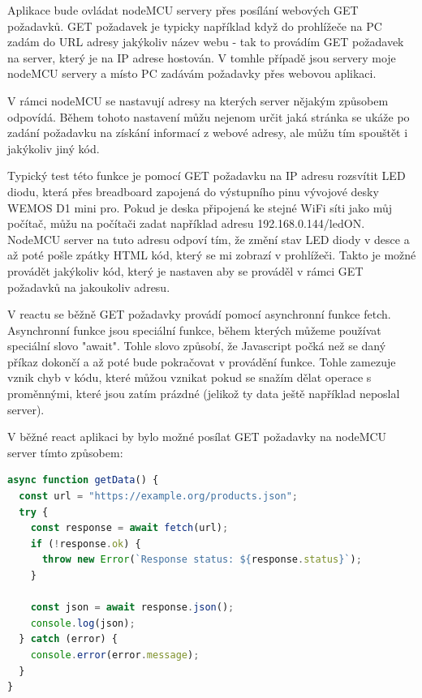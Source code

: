 Aplikace bude ovládat nodeMCU servery přes posílání webových GET požadavků. GET požadavek je typicky například když do prohlížeče na PC zadám do URL adresy jakýkoliv název webu - tak to provádím GET požadavek na server, který je na IP adrese hostován. V tomhle případě jsou servery moje nodeMCU servery a místo PC zadávám požadavky přes webovou aplikaci.

V rámci nodeMCU se nastavují adresy na kterých server nějakým způsobem odpovídá. Během tohoto nastavení můžu nejenom určit jaká stránka se ukáže po zadání požadavku na získání informací z webové adresy, ale můžu tím spouštět i jakýkoliv jiný kód. 

Typický test této funkce je pomocí GET požadavku na IP adresu rozsvítit LED diodu, která přes breadboard zapojená do výstupního pinu vývojové desky WEMOS D1 mini pro. Pokud je deska připojená ke stejné WiFi síti jako můj počítač, můžu na počítači zadat například adresu 192.168.0.144/ledON. NodeMCU server na tuto adresu odpoví tím, že změní stav LED diody v desce a až poté pošle zpátky HTML kód, který se mi zobrazí v prohlížeči. Takto je možné provádět jakýkoliv kód, který je nastaven aby se prováděl v rámci GET požadavků na jakoukoliv adresu.

V reactu se běžně GET požadavky provádí pomocí asynchronní funkce fetch. Asynchronní funkce jsou speciální funkce, během kterých můžeme používat speciální slovo "await". Tohle slovo způsobí, že Javascript počká než se daný příkaz dokončí a až poté bude pokračovat v provádění funkce. Tohle zamezuje vznik chyb v kódu, které můžou vznikat pokud se snažím dělat operace s proměnnými, které jsou zatím prázdné (jelikož ty data ještě například neposlal server).

V běžné react aplikaci by bylo možné posílat GET požadavky na nodeMCU server tímto způsobem:

\begin{lstlisting}[language=JavaScript, caption={Základní způsob posílání GET požadavků v JavaScriptu}, label={lst:JavaScriptFetchFunkce}]
async function getData() {
  const url = "https://example.org/products.json";
  try {
    const response = await fetch(url);
    if (!response.ok) {
      throw new Error(`Response status: ${response.status}`);
    }

    const json = await response.json();
    console.log(json);
  } catch (error) {
    console.error(error.message);
  }
}
\end{lstlisting}


